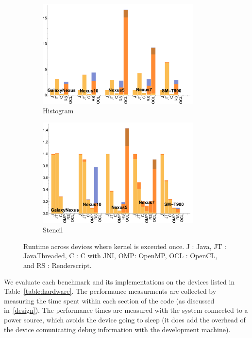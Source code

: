 \begin{figure}[t]
  \begin{subfigure}[b]{0.5\textwidth}
      \centering
      \includegraphics[width=0.9\textwidth]{data/Histogram_onecompute_time.pdf}
      \caption{Histogram}\label{fig:histo}
  \end{subfigure}
  \begin{subfigure}[b]{0.5\textwidth}
      \centering
      \includegraphics[width=0.9\textwidth]{data/Stencil_onecompute_time.pdf}
      \caption{Stencil}
      \label{fig:Stencil}
  \end{subfigure}

  \caption{Runtime across devices where kernel is exceuted once. J : Java, JT : JavaThreaded, C : C with JNI, OMP: OpenMP, OCL : OpenCL, and RS : Renderscript.}
\end{figure}
\FloatBarrier

We evaluate each benchmark and its implementations on the devices listed
  in Table~\ref{table:hardware}.
The performance measurments are collected by measuring the time
  spent within each section of the code (as discussed in~\ref{design}).
The performance times are measured with the system connected to a
  power source, which avoids the device going to sleep (it does add the
  overhead of the device comunicating debug information with the development
  machine).

